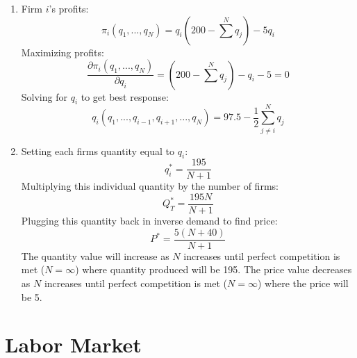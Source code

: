 \documentclass{article}
\begin{document}
\begin{enumerate}
    \item Firm $i$'s profits:
        $$\pi_i(q_1, ..., q_N) = q_i \left(200 - \sum
        \limits^N q_j\right) - 5 q_i$$
        Maximizing profits:
        $$\frac{ \partial \pi_i(q_1, ..., q_N)}{\partial q_i} = \left(200 -
        \sum \limits^N q_j\right) - q_i - 5 = 0$$
        Solving for $q_i$ to get best response:
        $$ q_i(q_1, ..., q_{i-1}, q_{i+1}, ..., q_N) = 97.5 - \frac{1}{2} \sum
        \limits_{ j \neq i}^{N} q_j $$
    \item Setting each firms quantity equal to $q_i$:
        $$q_i^* = \frac{195}{N+1}$$
        Multiplying this individual quantity by the number of firms:
        $$Q_T^* = \frac{195 N}{N + 1}$$
        Plugging this quantity back in inverse demand to find price:
        $$P^* = \frac{5(N + 40)}{N + 1}$$
        The quantity value will increase as $N$ increases until perfect
        competition is met ($N = \infty$) where quantity produced will be 195.
        The price value decreases as $N$ increases until perfect competition is
        met ($N = \infty$)  where the price will be 5.
\end{enumerate}

\section{Labor Market}
\end{document}
